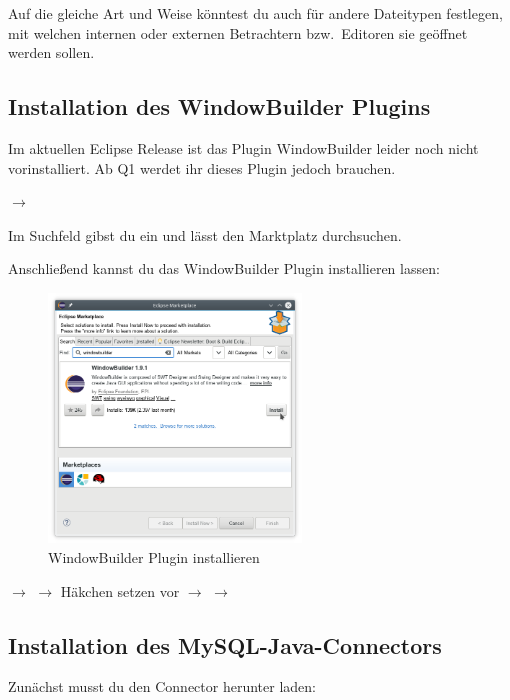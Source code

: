 Auf die gleiche Art und Weise könntest du auch für andere Dateitypen festlegen,
mit welchen internen oder externen Betrachtern bzw.\ Editoren sie geöffnet
werden sollen.


\subsection{Installation des WindowBuilder Plugins}

Im aktuellen Eclipse Release ist das Plugin WindowBuilder leider noch
nicht vorinstalliert. Ab Q1 werdet ihr dieses Plugin jedoch brauchen.

 $\rightarrow$ 

Im Suchfeld gibst du  ein und lässt den Marktplatz
durchsuchen.

Anschließend kannst du das WindowBuilder Plugin installieren lassen:

\begin{figure}
  \centering
   \includegraphics[width=0.6\textwidth]{./inf/SEKII/01_Vorbereitung/windowbuilder_plugin.png}
   \caption{WindowBuilder Plugin installieren}
   \label{fig:windowbuilder-plugin}
\end{figure}

$\rightarrow$  $\rightarrow$ Häkchen setzen vor
 $\rightarrow$  $\rightarrow$


\subsection{Installation des
MySQL-Java-Connectors}\label{mysql-connector-installation}

Zunächst musst du den Connector herunter laden:

